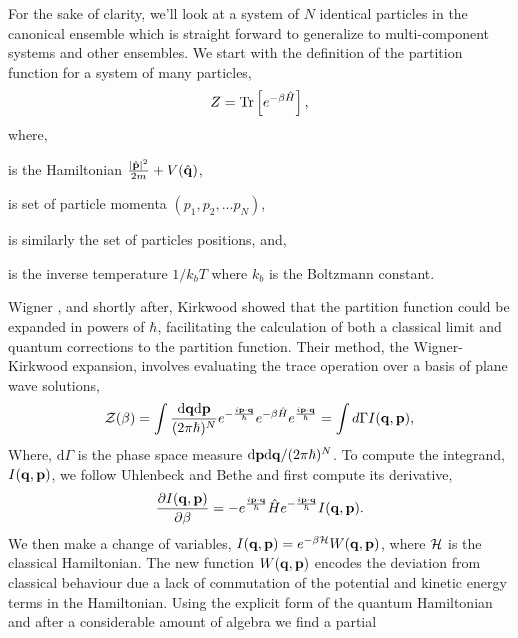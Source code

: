 For the sake of clarity, we'll look at a system of $N$ identical particles in
the canonical ensemble which is straight forward to generalize to
multi-component systems and other ensembles.  We start with the definition of
the partition function for a system of many particles,  
%
\begin{equation}
    \label{eq:quantum_partition}
    Z = \mathrm{Tr}\left[ e^{-\beta\hat{H}} \right], 
\end{equation} 
%
where, 
%
\begin{description}[align=right, labelwidth=1cm]
    \item[$\hat{H}$]{ is the Hamiltonian $\frac{\vert\hat{\mathbf{p}}\vert^2}{2m} +
        V(\hat{\mathbf{q}})$, 
    }
    \item[$\p$] is set of particle momenta $(p_1, p_2, ...p_N)$,
    \item[$\q$] is similarly the set of particles positions, and,
    \item[$\beta$]{ is the inverse temperature $1 / k_b T$ where $k_b$ is the
        Boltzmann constant.
    }  
\end{description}
%
Wigner \cite{PhysRev.40.749}, and shortly after, Kirkwood \cite{PhysRev.44.31}
showed that the partition function could be expanded in powers of $\hbar$,
facilitating the calculation of both a classical limit and quantum corrections
to the partition function.  Their method, the Wigner-Kirkwood expansion,
involves evaluating the trace operation over a basis of plane wave solutions,
%
\begin{equation}
    \mathcal{Z}(\beta) = \int \frac{\mathrm{d}\mathbf{q} \mathrm{d}\mathbf{p}}{(2\pi \hbar)^N}
        e^{-\frac{i\mathbf{p}\cdot\mathbf{q}}{\hbar}} 
        e^{-\beta \hat{H}} e^{\frac{i\mathbf{p}\cdot\mathbf{q}}{\hbar}} 
        = \int d\Gamma I(\mathbf{q}, \mathbf{p}), 
\end{equation}
%
Where, $\mathrm{d}\Gamma$ is the phase space measure
$\mathrm{d}\mathbf{p}\mathrm{d}\mathbf{q}/(2\pi\hbar)^N$.  To compute the integrand, $I(\mathbf{q}, \mathbf{p})$,
we follow Uhlenbeck and Bethe \cite{Uhlenbeck1936729} and first compute its
derivative,
%
\begin{equation}
    \frac{\partial I(\mathbf{q}, \mathbf{p})}{\partial \beta} = -e^{\frac{i\mathbf{p}\cdot\mathbf{q}}{\hbar}}\hat{H}e^{-\frac{i\mathbf{p}\cdot\mathbf{q}}{\hbar}} I(\mathbf{q}, \mathbf{p}).
\end{equation}
%
We then make a change of variables, $I(\mathbf{q}, \mathbf{p}) = e^{-\beta\mathcal{H}}W(\mathbf{q}, \mathbf{p})$,
where $\mathcal{H}$ is the classical Hamiltonian. The new function $W(\mathbf{q}, \mathbf{p})$ encodes
the deviation from classical behaviour due a lack of commutation of the potential
and kinetic energy terms in the Hamiltonian. Using the explicit form of the
quantum Hamiltonian and after a considerable amount of algebra we find  a partial 
